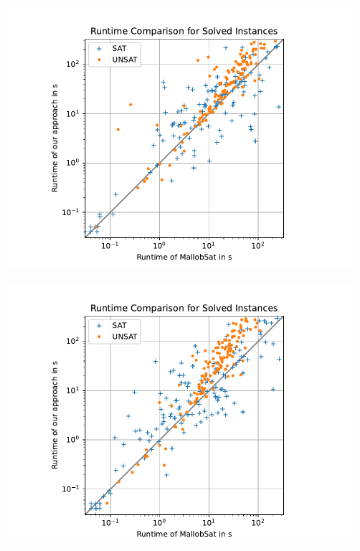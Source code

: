 \documentclass[12pt,a4paper,twoside]{scrartcl}
\numberwithin{equation}{section}
\begin{document}
\begin{figure}[!h]
  \center
  \begin{subfigure}[c]{.45\textwidth}
    \center
    \includegraphics[scale=.45]{plots/square_runtime_compare/square_runtime_1node.pdf}
    \label{fig:runtimeCompare1node}
  \end{subfigure}
  \begin{subfigure}[c]{.45\textwidth}
    \center
    \includegraphics[scale=.45]{plots/square_runtime_compare/square_runtime_4node.pdf}
    \label{fig:runtimeCompare4node}
  \end{subfigure}
  \begin{subfigure}[c]{.45\textwidth}

\end{subfigure}
\end{figure}
\end{document}
